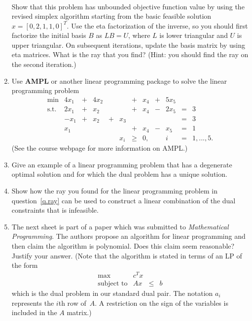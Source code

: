 \documentclass[12pt]{article}
\begin{document}
\begin{enumerate}
\begin{displaymath}
\begin{array}{lrcrcrcrcrcl}
             \end{array}
           \end{displaymath}
         Show that this problem has unbounded objective function value by
         using the revised simplex algorithm starting from the basic feasible
         solution $x = [0,2,1,1,0]^T$. Use the eta factorization of the
         inverse, so you should first factorize the initial basis $B$ as
         $LB=U$, where $L$ is lower triangular and $U$ is upper triangular.
         On subsequent iterations, update the basis matrix by using eta
         matrices.  What is the ray that you find?
         (Hint: you should find the ray on the second iteration.)
  \item Use {\bf AMPL} or another linear programming package to solve the linear
programming problem
           \begin{displaymath}
             \begin{array}{lrcrcrcrcrcl}
      \min          & 4x_1 & + & 4x_2 &   &    & + & x_4 & + & 5x_5 \\
      \mbox{s.t. }  & 2x_1 & + & x_2 &   &    & + & x_4 & - & 2x_5 & = & 3 \\
                    & -x_1 & + & x_2 & + & x_3&   &     &   &      & = & 3 \\
                    &  x_1 &   &     &   &    & + & x_4 & - &  x_5 & = & 1 \\
                    &      &   &     &   & x_i& \geq & 0, & & i & = & 1,...,5.
             \end{array}
           \end{displaymath}
           (See the course webpage for more information on AMPL.)
  \item Give an example of a linear programming problem that has a degenerate
  optimal solution and for which the dual problem has a unique solution.
  \item Show how the ray you found for the linear programming problem in
  question~\ref{q.ray} can be used to construct a linear combination of the dual
  constraints that is infeasible.
  \item The next sheet is part of a paper which was submitted to
    {\em Mathematical Programming}. The authors propose an algorithm for linear
    programming and then claim the algorithm is polynomial.
    Does this claim seem reasonable? Justify your answer.
    (Note that the algorithm is stated in terms of an LP of the form
    \begin{displaymath}
    \begin{array}{lrcl}
    \max & c^Tx \\
    \mbox{subject to} & Ax & \leq & b
    \end{array}
    \end{displaymath}
    which is the dual problem in our standard dual pair.
    The notation $a_i$ represents the $i$th row of~$A$.
    A restriction on the sign of the variables is included in the $A$ matrix.)
\end{enumerate}
\end{document}
